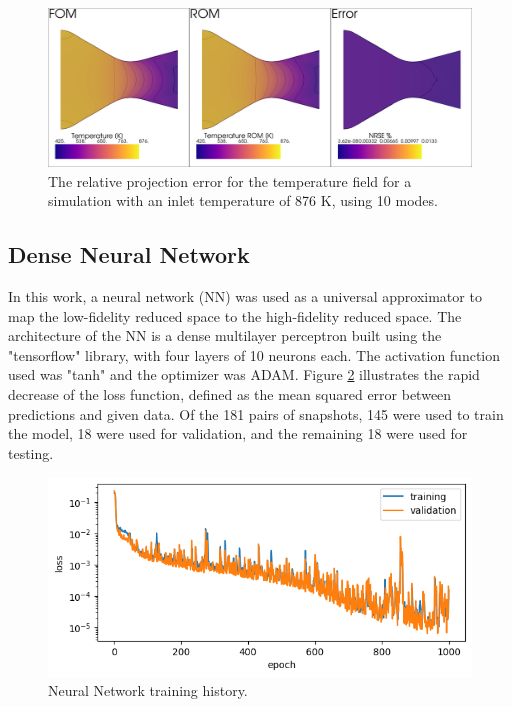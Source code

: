 \documentclass[10pt,fleqn,a4paper,twoside]{article}
\begin{document}
\begin{figure}[!ht]
	\begin{center}
		\includegraphics[width=\textwidth]{images/projection_error.png}
		\newline
		\caption{The relative projection error for the temperature field for a simulation with an inlet temperature of 876 K, using 10 modes.}
        \label{fig:projectionerror}
	\end{center}  
\end{figure}

\subsection{Dense Neural Network}

In this work, a neural network (NN)\cite{Hornik1989} was used as a universal approximator to map the low-fidelity reduced space to the high-fidelity reduced space. The architecture of the NN is a dense multilayer perceptron built using the "tensorflow" library, with four layers of 10 neurons each. The activation function used was "tanh" and the optimizer was ADAM. Figure \ref{fig:history} illustrates the rapid decrease of the loss function, defined as the mean squared error between predictions and given data. Of the 181 pairs of snapshots, 145 were used to train the model, 18 were used for validation, and the remaining 18 were used for testing.

\begin{figure}[!ht]
	\begin{center}
		\includegraphics[width=\textwidth]{images/history.png}
		\caption{Neural Network training history.}
        \label{fig:history}
	\end{center}  
\end{figure}
\end{document}

